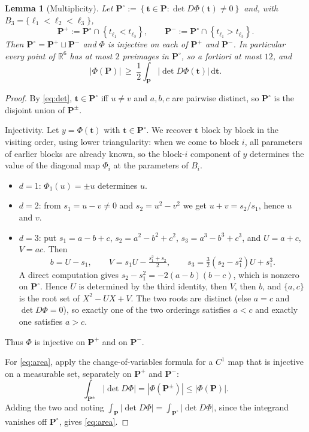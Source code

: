 \documentclass[11pt]{article}
\newtheorem{lemma}[theorem]{Lemma}
\newcommand{\R}{\mathbb{R}}
\newcommand{\dd}{\,\mathrm{d}}
\newcommand{\abs}[1]{\left|#1\right|}
\newcommand{\set}[1]{\left\{#1\right\}}
\begin{document}
\begin{lemma}[Multiplicity]
  \label{lem:multiplicity}
  Let $\mathbf P^{\circ}:=\set{\mathbf t\in\mathbf P: \det D\Phi(\mathbf t)\neq0}$ and,
  with $B_3=\{\ell_1<\ell_2<\ell_3\}$,
  \[
    \mathbf P^{+}:=\mathbf P^\circ\cap\set{t_{\ell_1}<t_{\ell_3}},\qquad
    \mathbf P^{-}:=\mathbf P^\circ\cap\set{t_{\ell_1}>t_{\ell_3}} .
  \]
  Then $\mathbf P^\circ=\mathbf P^+\sqcup\mathbf P^-$ and $\Phi$ is injective on
  each of $\mathbf P^+$ and $\mathbf P^-$.  In particular every point of
  $\R^6$ has at most $2$ preimages in $\mathbf P^\circ$, so a fortiori at most
  $12$, and
  \begin{equation}
    \label{eq:area}
    \abs{\Phi(\mathbf P)}\ \geq\ \frac12\int_{\mathbf P}\abs{\det D\Phi(\mathbf t)}\dd\mathbf t .
  \end{equation}
\end{lemma}

\begin{proof}
  By \eqref{eq:det}, $\mathbf t\in\mathbf P^\circ$ iff $u\neq v$ and $a,b,c$ are
  pairwise distinct, so $\mathbf P^\circ$ is the disjoint union of
  $\mathbf P^{\pm}$.

  Injectivity.  Let $y=\Phi(\mathbf t)$ with $\mathbf t\in\mathbf P^\circ$.  We
  recover $\mathbf t$ block by block in the visiting order, using lower
  triangularity: when we come to block $i$, all parameters of earlier blocks are
  already known, so the block-$i$ component of $y$ determines the value of the
  diagonal map $\Phi_i$ at the parameters of $B_i$.
  \begin{itemize}
    \item $d=1$: $\Phi_1(u)=\pm u$ determines $u$.
    \item $d=2$: from $s_1=u-v\neq0$ and $s_2=u^2-v^2$ we get $u+v=s_2/s_1$, hence
      $u$ and $v$.
    \item $d=3$: put $s_1=a-b+c$, $s_2=a^2-b^2+c^2$, $s_3=a^3-b^3+c^3$, and
      $U=a+c$, $V=ac$.  Then
      \[
        b=U-s_1,\qquad V=s_1U-\tfrac{s_1^2+s_2}{2},\qquad
        s_3=\tfrac32(s_2-s_1^2)U+s_1^3 .
      \]
      A direct computation gives $s_2-s_1^2=-2(a-b)(b-c)$, which is nonzero on
      $\mathbf P^\circ$.  Hence $U$ is determined by the third identity, then $V$,
      then $b$, and $\{a,c\}$ is the root set of $X^2-UX+V$.  The two roots are
      distinct (else $a=c$ and $\det D\Phi=0$), so exactly one of the two
      orderings satisfies $a<c$ and exactly one satisfies $a>c$.
  \end{itemize}
  Thus $\Phi$ is injective on $\mathbf P^{+}$ and on $\mathbf P^{-}$.

  For \eqref{eq:area}, apply the change-of-variables formula for a $C^1$ map that
  is injective on a measurable set, separately on $\mathbf P^{+}$ and
  $\mathbf P^{-}$:
  \[
    \int_{\mathbf P^{\pm}}\abs{\det D\Phi}=\abs{\Phi(\mathbf P^{\pm})}
    \leq\abs{\Phi(\mathbf P)} .
  \]
  Adding the two and noting $\int_{\mathbf P}\abs{\det D\Phi}
  =\int_{\mathbf P^\circ}\abs{\det D\Phi}$, since the integrand vanishes off
  $\mathbf P^\circ$, gives \eqref{eq:area}.
\end{proof}
\end{document}
